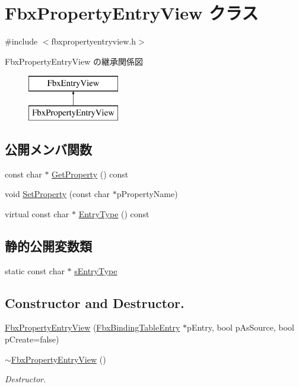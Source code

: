 \hypertarget{class_fbx_property_entry_view}{}\section{Fbx\+Property\+Entry\+View クラス}
\label{class_fbx_property_entry_view}


{\ttfamily \#include $<$fbxpropertyentryview.\+h$>$}

Fbx\+Property\+Entry\+View の継承関係図\begin{figure}[H]
\begin{center}
\leavevmode
\includegraphics[height=2.000000cm]{class_fbx_property_entry_view}
\end{center}
\end{figure}
\subsection*{公開メンバ関数}
\begin{DoxyCompactItemize}
\item 
const char $\ast$ \hyperlink{class_fbx_property_entry_view_a22f4b61845256d48885dc873c7341edc}{Get\+Property} () const
\item 
void \hyperlink{class_fbx_property_entry_view_adcf0a92938e634f1bcedaaf31281de61}{Set\+Property} (const char $\ast$p\+Property\+Name)
\item 
virtual const char $\ast$ \hyperlink{class_fbx_property_entry_view_a36affcd0bce8be2a4b5f94ccd60fa462}{Entry\+Type} () const
\end{DoxyCompactItemize}
\subsection*{静的公開変数類}
\begin{DoxyCompactItemize}
\item 
static const char $\ast$ \hyperlink{class_fbx_property_entry_view_a862b7d0e633c2cb246b5b63a48ffd706}{s\+Entry\+Type}
\end{DoxyCompactItemize}
\subsection*{Constructor and Destructor.}
\begin{DoxyCompactItemize}
\item 
\hyperlink{class_fbx_property_entry_view_ac1d9bbc86521ef0f3d8a1761568bc19c}{Fbx\+Property\+Entry\+View} (\hyperlink{class_fbx_binding_table_entry}{Fbx\+Binding\+Table\+Entry} $\ast$p\+Entry, bool p\+As\+Source, bool p\+Create=false)
\item 
\hyperlink{class_fbx_property_entry_view_a9c6c4f93cb0a12ba2f2251e773892a56}{$\sim$\+Fbx\+Property\+Entry\+View} ()
\begin{DoxyCompactList}\small\item\em Destructor. \end{DoxyCompactList}\end{DoxyCompactItemize}
